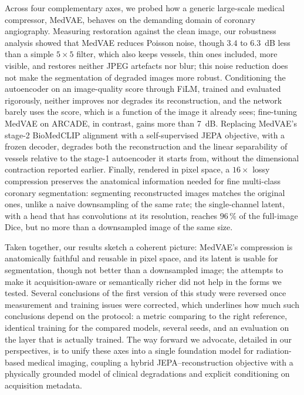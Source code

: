 \documentclass[conference]{IEEEtran}
\begin{document}
Across four complementary axes, we probed how a generic large-scale medical compressor, MedVAE, behaves on the demanding domain of coronary angiography. Measuring restoration against the clean image, our robustness analysis showed that MedVAE reduces Poisson noise, though $3.4$ to $6.3$~dB less than a simple $5\times5$ filter, which also keeps vessels, thin ones included, more visible, and restores neither JPEG artefacts nor blur; this noise reduction does not make the segmentation of degraded images more robust. Conditioning the autoencoder on an image-quality score through FiLM, trained and evaluated rigorously, neither improves nor degrades its reconstruction, and the network barely uses the score, which is a function of the image it already sees; fine-tuning MedVAE on ARCADE, in contrast, gains more than 7~dB. Replacing MedVAE's stage-2 BioMedCLIP alignment with a self-supervised JEPA objective, with a frozen decoder, degrades both the reconstruction and the linear separability of vessels relative to the stage-1 autoencoder it starts from, without the dimensional contraction reported earlier. Finally, rendered in pixel space, a $16\times$ lossy compression preserves the anatomical information needed for fine multi-class coronary segmentation: segmenting reconstructed images matches the original ones, unlike a naive downsampling of the same rate; the single-channel latent, with a head that has convolutions at its resolution, reaches $96\,\%$ of the full-image Dice, but no more than a downsampled image of the same size.

Taken together, our results sketch a coherent picture: MedVAE's compression is anatomically faithful and reusable in pixel space, and its latent is usable for segmentation, though not better than a downsampled image; the attempts to make it acquisition-aware or semantically richer did not help in the forms we tested. Several conclusions of the first version of this study were reversed once measurement and training issues were corrected, which underlines how much such conclusions depend on the protocol: a metric comparing to the right reference, identical training for the compared models, several seeds, and an evaluation on the layer that is actually trained. The way forward we advocate, detailed in our perspectives, is to unify these axes into a single foundation model for radiation-based medical imaging, coupling a hybrid JEPA--reconstruction objective with a physically grounded model of clinical degradations and explicit conditioning on acquisition metadata.
\end{document}
